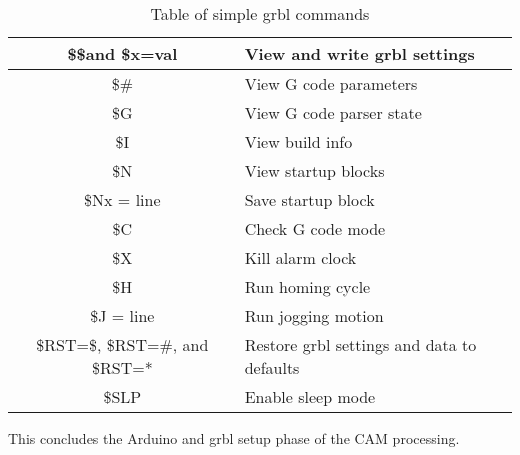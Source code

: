 \begin{table}[h]
 \begin{center}
  \caption{Table of simple grbl commands}
  \begin{tabular}{|c|l|}
   \hline
   \$\$and \$x=val                 & View and write grbl settings               \\
   \hline
   \$\#                            & View G code parameters                     \\
   \hline
   \$G                             & View G code parser state                   \\
   \hline
   \$I                             & View build info                            \\
   \hline
   \$N                             & View startup blocks                        \\
   \hline
   \$Nx = line                     & Save startup block                         \\
   \hline
   \$C                             & Check G code mode                          \\
   \hline
   \$X                             & Kill alarm clock                           \\
   \hline
   \$H                             & Run homing cycle                           \\
   \hline
   \$J = line                      & Run jogging motion                         \\
   \hline
   \$RST=\$, \$RST=\#, and \$RST=* & Restore grbl settings and data to defaults \\
   \hline
   \$SLP                           & Enable sleep mode                          \\
   \hline
  \end{tabular}
 \end{center}
 \label{tab:grbl_cmds}
\end{table}

This concludes the Arduino and grbl setup phase of the CAM processing.

